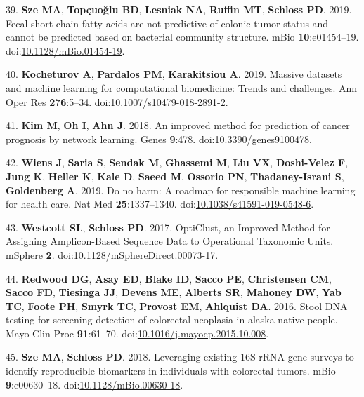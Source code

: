 \documentclass[11pt,]{article}
\begin{document}
\hypertarget{ref-sze_fecal_2019}{}
39. \textbf{Sze MA}, \textbf{Topçuoğlu BD}, \textbf{Lesniak NA},
\textbf{Ruffin MT}, \textbf{Schloss PD}. 2019. Fecal short-chain fatty
acids are not predictive of colonic tumor status and cannot be predicted
based on bacterial community structure. mBio \textbf{10}:e01454--19.
doi:\href{https://doi.org/10.1128/mBio.01454-19}{10.1128/mBio.01454-19}.

\hypertarget{ref-kocheturov_massive_2019}{}
40. \textbf{Kocheturov A}, \textbf{Pardalos PM}, \textbf{Karakitsiou A}.
2019. Massive datasets and machine learning for computational
biomedicine: Trends and challenges. Ann Oper Res \textbf{276}:5--34.
doi:\href{https://doi.org/10.1007/s10479-018-2891-2}{10.1007/s10479-018-2891-2}.

\hypertarget{ref-kim_improved_2018}{}
41. \textbf{Kim M}, \textbf{Oh I}, \textbf{Ahn J}. 2018. An improved
method for prediction of cancer prognosis by network learning. Genes
\textbf{9}:478.
doi:\href{https://doi.org/10.3390/genes9100478}{10.3390/genes9100478}.

\hypertarget{ref-wiens_no_2019}{}
42. \textbf{Wiens J}, \textbf{Saria S}, \textbf{Sendak M},
\textbf{Ghassemi M}, \textbf{Liu VX}, \textbf{Doshi-Velez F},
\textbf{Jung K}, \textbf{Heller K}, \textbf{Kale D}, \textbf{Saeed M},
\textbf{Ossorio PN}, \textbf{Thadaney-Israni S}, \textbf{Goldenberg A}.
2019. Do no harm: A roadmap for responsible machine learning for health
care. Nat Med \textbf{25}:1337--1340.
doi:\href{https://doi.org/10.1038/s41591-019-0548-6}{10.1038/s41591-019-0548-6}.

\hypertarget{ref-westcott_opticlust_2017}{}
43. \textbf{Westcott SL}, \textbf{Schloss PD}. 2017. OptiClust, an
Improved Method for Assigning Amplicon-Based Sequence Data to
Operational Taxonomic Units. mSphere \textbf{2}.
doi:\href{https://doi.org/10.1128/mSphereDirect.00073-17}{10.1128/mSphereDirect.00073-17}.

\hypertarget{ref-redwood_stool_2016}{}
44. \textbf{Redwood DG}, \textbf{Asay ED}, \textbf{Blake ID},
\textbf{Sacco PE}, \textbf{Christensen CM}, \textbf{Sacco FD},
\textbf{Tiesinga JJ}, \textbf{Devens ME}, \textbf{Alberts SR},
\textbf{Mahoney DW}, \textbf{Yab TC}, \textbf{Foote PH}, \textbf{Smyrk
TC}, \textbf{Provost EM}, \textbf{Ahlquist DA}. 2016. Stool DNA testing
for screening detection of colorectal neoplasia in alaska native people.
Mayo Clin Proc \textbf{91}:61--70.
doi:\href{https://doi.org/10.1016/j.mayocp.2015.10.008}{10.1016/j.mayocp.2015.10.008}.

\hypertarget{ref-sze_leveraging_2018}{}
45. \textbf{Sze MA}, \textbf{Schloss PD}. 2018. Leveraging existing 16S
rRNA gene surveys to identify reproducible biomarkers in individuals
with colorectal tumors. mBio \textbf{9}:e00630--18.
doi:\href{https://doi.org/10.1128/mBio.00630-18}{10.1128/mBio.00630-18}.
\end{document}
